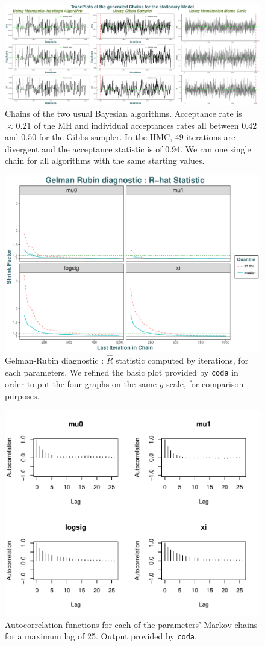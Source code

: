 \begin{figure}[!htb]
	\centering	\includegraphics[width=1\linewidth]{traceall.pdf}	\caption{ Chains of the two usual Bayesian algorithms. Acceptance rate is $\approx0.21$ of the MH and individual acceptances rates all between $0.42$ and $0.50$ for the Gibbs sampler. In the HMC, $49$ iterations are divergent and the acceptance statistic is of $0.94$.
	We ran one single chain for all algorithms with the same starting values.}\label{fig:mhgibhmc}
\end{figure}


\begin{figure}[!htb]
	\centering	\includegraphics[width=0.7\linewidth]{gelmdiag.pdf}\caption{Gelman-Rubin diagnostic : $\hat{R}$ statistic computed by iterations, for each parameters. We refined the basic plot provided by \texttt{coda} in order to put the four graphs on the same $y$-scale, for comparison purposes.}\label{fig:gelmdiag}
\end{figure}


\begin{figure}[!htb]
	\centering	\includegraphics[width=0.8\linewidth]{autocor.pdf}\caption{Autocorrelation functions for each of the parameters' Markov chains for a maximum lag of 25. Output provided by \texttt{coda}. }\label{fig:autocor}
\end{figure}

